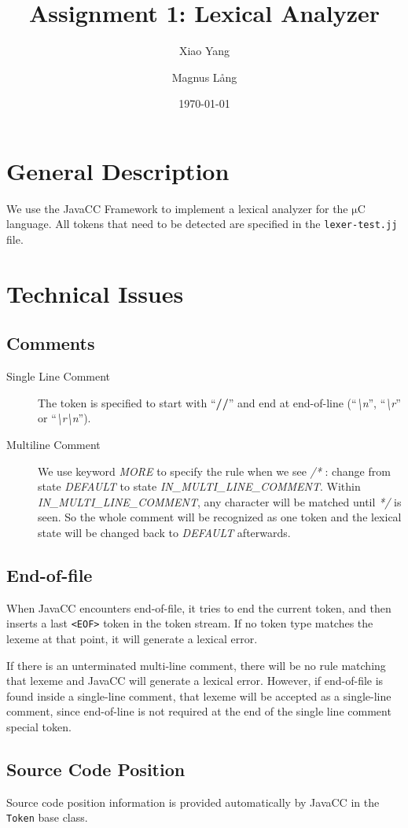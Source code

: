 \documentclass[a4paper,11pt]{article}
\title{Assignment 1: Lexical Analyzer}
\author{Xiao Yang \and Magnus L{\aa}ng} %
\date{\today}
\newcommand{\token}[1]{\texttt{<#1>}}
\newcommand{\uC}{{$\mathrm{\mu}$}C }
\begin{document}
\maketitle
\section{General Description}
We use the JavaCC Framework to implement a lexical analyzer for the \uC
language. All tokens that need to be detected are specified in the
\texttt{lexer-test.jj} file.

\section{Technical Issues}
\subsection{Comments}
\begin{description}
	\item[Single Line Comment] The token is specified to start with ``\textbf{//}'' and end at end-of-line (``\textit{\textbackslash n}'', ``\textit{\textbackslash r}'' or ``\textit{\textbackslash r\textbackslash n}'').
	\item[Multiline Comment] We use keyword \emph{MORE} to specify the rule when we see \textit{/*} : change from state \emph{DEFAULT} to state \emph{IN\_MULTI\_LINE\_COMMENT}. Within \emph{IN\_MULTI\_LINE\_COMMENT}, any character will be matched until \textit{*/} is seen. So the whole comment will be recognized as one token and the lexical state will be changed back to \emph{DEFAULT} afterwards.

\end{description}
\subsection{End-of-file}
When JavaCC encounters end-of-file, it tries to end the current token, and then
inserts a last \token{EOF} token in the token stream. If no token type matches
the lexeme at that point, it will generate a lexical error.

If there is an unterminated multi-line comment, there will be no rule matching
that lexeme and JavaCC will generate a lexical error. However, if end-of-file is
found inside a single-line comment, that lexeme will be accepted as a
single-line comment, since end-of-line is not required at the end of the single
line comment special token.

\subsection{Source Code Position}
Source code position information is provided automatically by JavaCC in the
\texttt{Token} base class.
\end{document}

